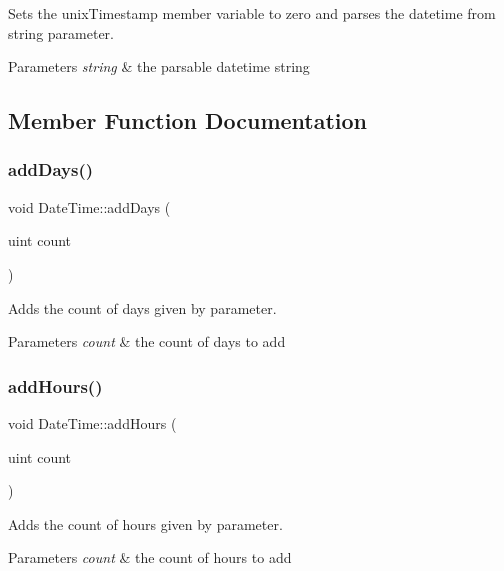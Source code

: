 Sets the unix\+Timestamp member variable to zero and parses the datetime from string parameter. 


\begin{DoxyParams}{Parameters}
{\em string} & the parsable datetime string \\
\hline
\end{DoxyParams}


\subsection{Member Function Documentation}
\mbox{\label{class_date_time_a9209722e2520862295252b12947d0f97}} 
\subsubsection{\texorpdfstring{addDays()}{addDays()}}
{\footnotesize\ttfamily void Date\+Time\+::add\+Days (\begin{DoxyParamCaption}\item[{uint}]{count }\end{DoxyParamCaption})}



Adds the count of days given by parameter. 


\begin{DoxyParams}{Parameters}
{\em count} & the count of days to add \\
\hline
\end{DoxyParams}
\mbox{\label{class_date_time_aa4ba03bfc47a41d0fcbf5087908fe7ab}} 
\subsubsection{\texorpdfstring{addHours()}{addHours()}}
{\footnotesize\ttfamily void Date\+Time\+::add\+Hours (\begin{DoxyParamCaption}\item[{uint}]{count }\end{DoxyParamCaption})}



Adds the count of hours given by parameter. 


\begin{DoxyParams}{Parameters}
{\em count} & the count of hours to add \\
\hline
\end{DoxyParams}
\mbox{\label{class_date_time_a1da975e9de48724cc5c0b08dbfdb1b3c}} 

